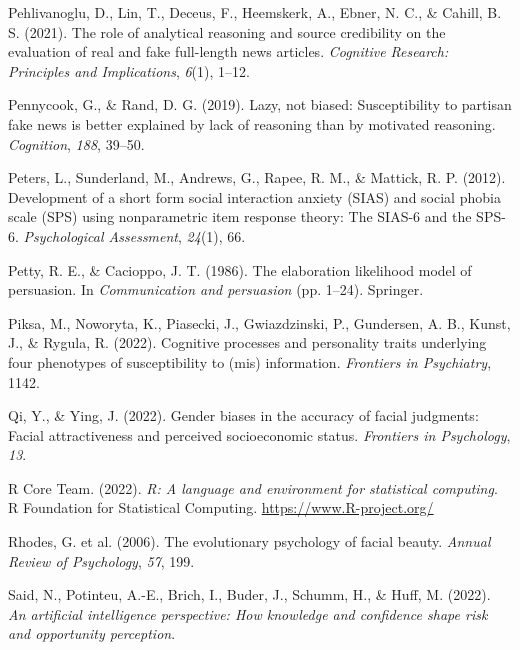 \documentclass[
  man,floatsintext]{apa6}
\newlength{\cslhangindent}
\newlength{\cslentryspacingunit} %
\newenvironment{CSLReferences}[2] %
 {%
  \setlength{\parindent}{0pt}
  \ifodd #1
  \let\oldpar\par
  \def\par{\hangindent=\cslhangindent\oldpar}
  \fi
  \setlength{\parskip}{#2\cslentryspacingunit}
 }%
 {}
\begin{document}
\begin{CSLReferences}{1}{0}
\leavevmode{}%
Pehlivanoglu, D., Lin, T., Deceus, F., Heemskerk, A., Ebner, N. C., \& Cahill, B. S. (2021). The role of analytical reasoning and source credibility on the evaluation of real and fake full-length news articles. \emph{Cognitive Research: Principles and Implications}, \emph{6}(1), 1--12.

\leavevmode{}%
Pennycook, G., \& Rand, D. G. (2019). Lazy, not biased: Susceptibility to partisan fake news is better explained by lack of reasoning than by motivated reasoning. \emph{Cognition}, \emph{188}, 39--50.

\leavevmode{}%
Peters, L., Sunderland, M., Andrews, G., Rapee, R. M., \& Mattick, R. P. (2012). Development of a short form social interaction anxiety (SIAS) and social phobia scale (SPS) using nonparametric item response theory: The SIAS-6 and the SPS-6. \emph{Psychological Assessment}, \emph{24}(1), 66.

\leavevmode{}%
Petty, R. E., \& Cacioppo, J. T. (1986). The elaboration likelihood model of persuasion. In \emph{Communication and persuasion} (pp. 1--24). Springer.

\leavevmode{}%
Piksa, M., Noworyta, K., Piasecki, J., Gwiazdzinski, P., Gundersen, A. B., Kunst, J., \& Rygula, R. (2022). Cognitive processes and personality traits underlying four phenotypes of susceptibility to (mis) information. \emph{Frontiers in Psychiatry}, 1142.

\leavevmode{}%
Qi, Y., \& Ying, J. (2022). Gender biases in the accuracy of facial judgments: Facial attractiveness and perceived socioeconomic status. \emph{Frontiers in Psychology}, \emph{13}.

\leavevmode{}%
R Core Team. (2022). \emph{R: A language and environment for statistical computing}. R Foundation for Statistical Computing. \url{https://www.R-project.org/}

\leavevmode{}%
Rhodes, G. et al. (2006). The evolutionary psychology of facial beauty. \emph{Annual Review of Psychology}, \emph{57}, 199.

\leavevmode{}%
Said, N., Potinteu, A.-E., Brich, I., Buder, J., Schumm, H., \& Huff, M. (2022). \emph{An artificial intelligence perspective: How knowledge and confidence shape risk and opportunity perception}.


\end{CSLReferences}
\end{document}
